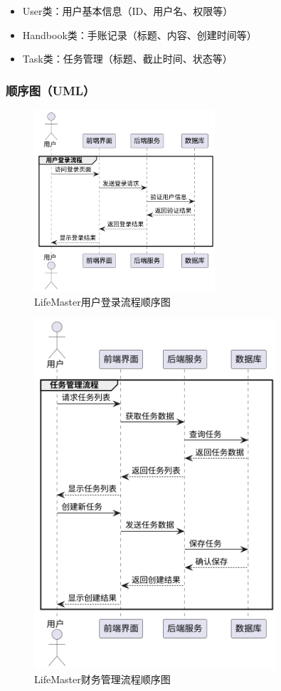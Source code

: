 \documentclass[a4paper]{article}
\begin{document}
\begin{itemize}
    \item User类：用户基本信息（ID、用户名、权限等）
    \item Handbook类：手账记录（标题、内容、创建时间等）
    \item Task类：任务管理（标题、截止时间、状态等）
\end{itemize}

\subsubsection{顺序图（UML）}

\begin{figure}[H]
\centering
\includegraphics[width=0.6\textwidth]{img/sequence_diagram1.png}
\caption{LifeMaster用户登录流程顺序图}
\end{figure}

\begin{figure}[H]
\centering
\includegraphics[width=0.8\textwidth]{img/sequence_diagram2.png}
\caption{LifeMaster财务管理流程顺序图}
\end{figure}
\end{document}
